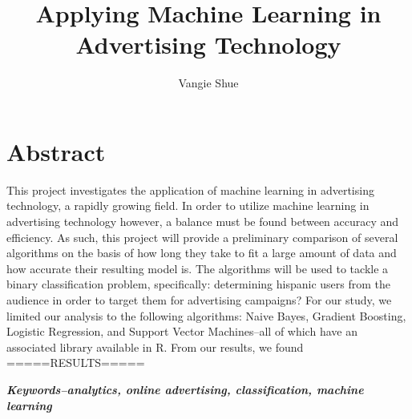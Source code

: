 \documentclass[a4paper]{article}
\title{Applying Machine Learning in Advertising Technology}
\author{Vangie Shue}
\begin{document}



\maketitle
\section*{Abstract}
This project investigates the application of machine learning in advertising technology, a rapidly growing field. In order to utilize machine learning in advertising technology however, a balance must be found between accuracy and efficiency. As such, this project will provide a preliminary comparison of several algorithms on the basis of how long they take to fit a large amount of data and how accurate their resulting model is. The algorithms will be used to tackle a binary classification problem, specifically: determining hispanic users from the audience in order to target them for advertising campaigns? For our study, we limited our analysis to the following algorithms: Naive Bayes, Gradient Boosting, Logistic Regression, and Support Vector Machines--all of which have an associated library available in R. From our results, we found =====RESULTS=====


\emph{\textbf{Keywords--analytics, online advertising, classification, machine learning}}
\end{document}
